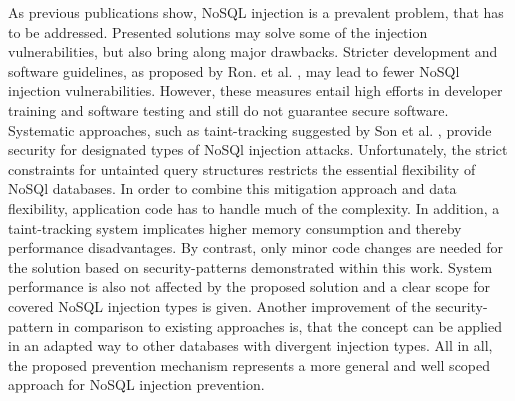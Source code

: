 As previous publications show, NoSQL injection is a prevalent problem, that has to be addressed. Presented solutions may solve some of the injection vulnerabilities, but also bring along major drawbacks. Stricter development and software guidelines, as proposed by Ron. et al. \cite{Ron:2016}, may lead to fewer NoSQl injection vulnerabilities. However, these measures entail high efforts in developer training and software testing and still do not guarantee secure software. Systematic approaches, such as taint-tracking suggested by Son et al. \cite{Son:2013}, provide security for designated types of NoSQl injection attacks. Unfortunately, the strict constraints for untainted query structures restricts the essential flexibility of NoSQl databases. In order to combine this mitigation approach and data flexibility, application code has to handle much of the complexity. In addition, a taint-tracking system implicates higher memory consumption and thereby performance disadvantages. By contrast, only minor code changes are needed for the solution based on security-patterns demonstrated within this work. System performance is also not affected by the proposed solution and a clear scope for covered NoSQL injection types is given. Another improvement of the security-pattern in comparison to existing approaches is, that the concept can be applied in an adapted way to other databases with divergent injection types. All in all, the proposed prevention mechanism represents a more general and well scoped approach for NoSQL injection prevention.
